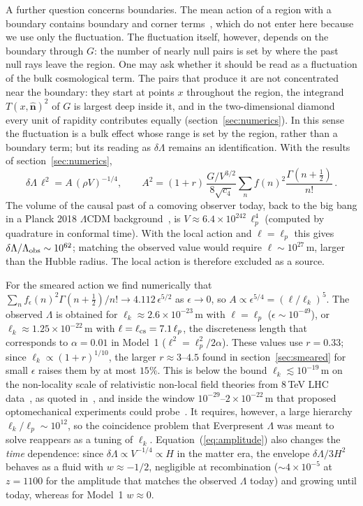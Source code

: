 \documentclass{iopjournal}
\newcommand{\eref}[1]{(\ref{#1})}
\newcommand{\rhoV}{\rho V}
\begin{document}
A further question concerns boundaries. The mean action of a region with a
boundary contains boundary and corner
terms~\cite{Buck2015,Dowker2025,Machet2021}, which do not enter here because
we use only the fluctuation. The fluctuation itself, however, depends on the
boundary through $G$: the number of nearly null pairs is set by where the
past null rays leave the region. One may ask whether it should be
read as a fluctuation of the bulk cosmological term. The pairs that produce
it are not concentrated near the boundary: they start at points $x$
throughout the region, the integrand $T(x,\hat{\boldsymbol n})^2$ of $G$ is
largest deep inside it, and in the two-dimensional diamond every unit of
rapidity contributes equally (section~\ref{sec:numerics}). In this sense the
fluctuation is a bulk effect whose range is set by the region, rather than a
boundary term; but its reading as $\delta\Lambda$ remains an identification.
With the results of section~\ref{sec:numerics},
\begin{equation}
\delta\Lambda\,\ell^2=A\,(\rhoV)^{-1/4},\qquad
A^2=(1+r)\,\frac{G/V^{3/2}}{8\sqrt{c_4}}\sum_nf(n)^2\frac{\Gamma(n+\frac12)}{n!}\,.
\label{eq:amplitude}
\end{equation}
The volume of the causal past of a comoving observer today, back to the big
bang in a Planck 2018 $\Lambda$CDM background~\cite{Planck2018}, is
$V\approx6.4\times10^{242}\,\ell_p^4$ (computed by quadrature in conformal
time). With the local action and $\ell=\ell_p$ this gives
$\delta\Lambda/\Lambda_{\rm obs}\sim10^{62}$; matching the observed value would
require $\ell\sim10^{27}\,$m, larger than the Hubble radius. The local action is
therefore excluded as a source.

For the smeared action we find numerically that
$\sum_nf_\epsilon(n)^2\Gamma(n+\frac12)/n!\to4.112\,\epsilon^{5/2}$ as
$\epsilon\to0$, so $A\propto\epsilon^{5/4}=(\ell/\ell_k)^5$. The observed
$\Lambda$ is obtained for $\ell_k\approx2.6\times10^{-23}\,$m with
$\ell=\ell_p$ ($\epsilon\sim10^{-49}$), or $\ell_k\approx1.25\times10^{-22}\,$m
with $\ell=\ell_{\rm cs}=7.1\,\ell_p$, the discreteness length that corresponds
to $\alpha=0.01$ in Model~1 ($\ell^2=\ell_p^2/2\alpha$). These values use $r=0.33$; since
$\ell_k\propto(1+r)^{1/10}$, the larger $r\approx3$--$4.5$ found in
section~\ref{sec:smeared} for small $\epsilon$ raises them by at most $15\%$.
This is below the bound $\ell_k\lesssim10^{-19}\,$m on the non-locality scale
of relativistic non-local field theories from $8\,$TeV LHC
data~\cite{Biswas2015}, as quoted in~\cite{Belenchia2016}, and inside the
window $10^{-29}$--$2\times10^{-22}\,$m that proposed optomechanical
experiments could probe~\cite{Belenchia2016}. It requires, however, a large hierarchy $\ell_k/\ell_p\sim10^{12}$, so the
coincidence problem that Everpresent $\Lambda$ was meant to solve reappears as
a tuning of $\ell_k$. Equation~\eref{eq:amplitude} also changes the
\emph{time} dependence: since $\delta\Lambda\propto V^{-1/4}\propto H$ in
the matter era, the envelope $\delta\Lambda/3H^2$ behaves as a fluid with
$w\approx-1/2$, negligible at recombination ($\sim4\times10^{-5}$ at $z=1100$
for the amplitude that matches the observed $\Lambda$ today) and growing until
today, whereas for Model~1 $w\approx0$.
\end{document}

